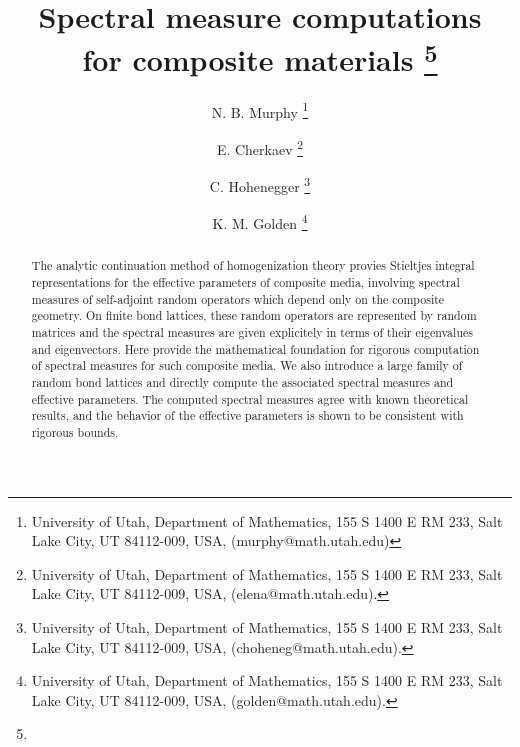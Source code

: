 \documentclass{cmslatex}
\begin{document}
\title{Spectral measure computations \\ for composite materials
\thanks{%
}}
%
\author{N. B. Murphy
\thanks {University of Utah, Department of Mathematics, 155 S 1400 E
  RM 233, Salt Lake City, UT 84112-009, USA, (murphy@math.utah.edu)}
%
\and E. Cherkaev
\thanks {University of Utah, Department of Mathematics, 155 S 1400 E
  RM 233, Salt Lake City, UT 84112-009, USA, (elena@math.utah.edu).}
%
\and C. Hohenegger
\thanks {University of Utah, Department of Mathematics, 155 S 1400 E
  RM 233, Salt Lake City, UT 84112-009, USA, (choheneg@math.utah.edu).}
%
\and K. M. Golden
\thanks {University of Utah, Department of Mathematics, 155 S 1400 E
  RM 233, Salt Lake City, UT 84112-009, USA, (golden@math.utah.edu).}
}



\pagestyle{myheadings} \maketitle

\begin{abstract}
The analytic continuation method of homogenization theory provies
Stieltjes integral representations for the effective parameters of
composite media, involving spectral measures of self-adjoint random
operators which depend only on the composite geometry. On finite bond
lattices, these random operators are represented by random matrices
and the spectral measures are given explicitely in terms of their
eigenvalues and eigenvectors. Here provide the mathematical foundation
for rigorous computation of spectral measures for such composite
media. We also introduce a large family of random bond lattices and
directly compute the associated spectral measures and effective
parameters. The computed spectral measures agree with known
theoretical results, and the behavior of the effective parameters is
shown to be consistent with rigorous bounds.
\end{abstract}
\end{document}

